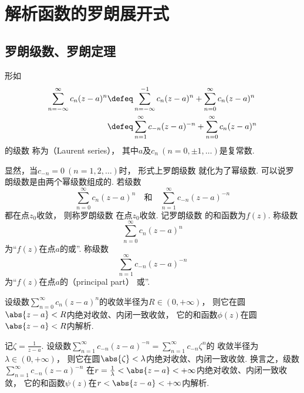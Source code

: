 \section{解析函数的罗朗展开式}
\subsection{罗朗级数、罗朗定理}
\begin{definition}
形如\begin{equation}\label{equation:解析函数的级数表示.罗朗级数}
\begin{split}
	\sum_{n=-\infty}^\infty c_n (z-a)^n
	&\defeq \sum_{n=-\infty}^{-1} c_n (z-a)^n + \sum_{n=0}^\infty c_n (z-a)^n \\
	&\defeq \sum_{n=1}^\infty c_{-n} (z-a)^{-n} + \sum_{n=0}^\infty c_n (z-a)^n
\end{split}
\end{equation}的级数
称为（Laurent series），
其中\(a\)及\(c_n\ (n=0,\pm1,\dotsc)\)是复常数.
\end{definition}
显然，当\(c_{-n}=0\ (n=1,2,\dotsc)\)时，
形式上罗朗级数  就化为了幂级数.
可以说罗朗级数是由两个幂级数组成的.
若级数\begin{equation*}
	\sum_{n=0}^\infty c_n (z-a)^n
	\quad\text{和}\quad
	\sum_{n=1}^\infty c_{-n} (z-a)^{-n}
\end{equation*}都在点\(z_0\)收敛，
则称罗朗级数  在点\(z_0\)收敛.
记罗朗级数  的和函数为\(f(z)\).
称级数\begin{equation*}
	\sum_{n=0}^\infty c_n (z-a)^n
\end{equation*}为“\(f(z)\)在点\(a\)的或”.
称级数\begin{equation*}
	\sum_{n=1}^\infty c_{-n} (z-a)^{-n}
\end{equation*}为“\(f(z)\)在点\(a\)的（principal part）
或”.

设级数\(\sum_{n=0}^\infty c_n (z-a)^n\)的收敛半径为\(R \in (0,+\infty)\)，
则它在圆\(\abs{z-a}<R\)内绝对收敛、内闭一致收敛，
它的和函数\(\phi(z)\)在圆\(\abs{z-a}<R\)内解析.

记\(\zeta = \frac{1}{z-a}\).
设级数\(\sum_{n=1}^\infty c_{-n} (z-a)^{-n} = \sum_{n=1}^\infty c_{-n} \zeta^n\)的
收敛半径为\(\lambda \in (0,+\infty)\)，
则它在圆\(\abs{\zeta} < \lambda\)内绝对收敛、内闭一致收敛.
换言之，级数\(\sum_{n=1}^\infty c_{-n} (z-a)^{-n}\)
在\(r = \frac{1}{\lambda} < \abs{z-a} < +\infty\)内绝对收敛、内闭一致收敛，
它的和函数\(\psi(z)\)在\(r < \abs{z-a} < +\infty\)内解析.

